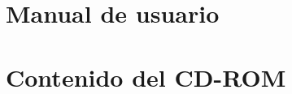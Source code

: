 \documentclass[openright,twoside,10pt]{book}
\begin{document}
    \chapter{Manual de usuario}\label{manual-de-usuario}
    
    \chapter{Contenido del CD-ROM}\label{contenido-del-cd-rom}
    
    
    \nocite{*} \printbibliography

    \cleardoublepage
    \printbibliography

\end{document}
